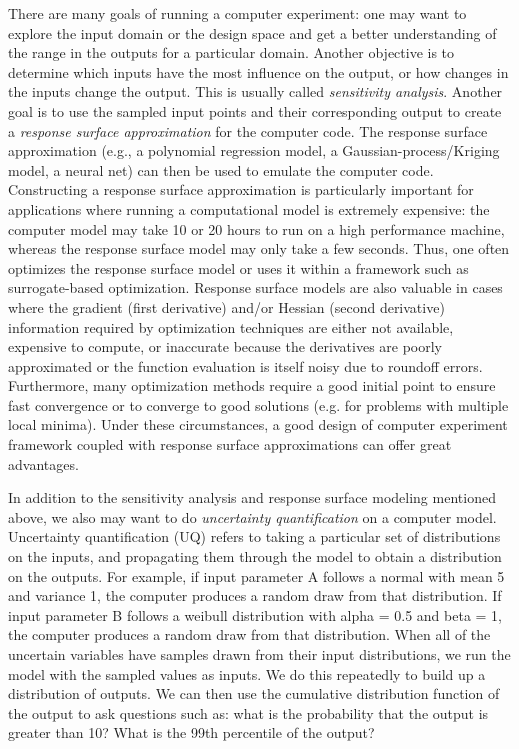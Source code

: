 There are many goals of running a computer experiment: one may want to 
explore the input domain or the design space and get a better understanding 
of the range in the outputs for a particular domain.  Another objective is 
to determine which inputs have the most influence on the output, or how 
changes in the inputs change the output.  This is usually called 
\emph{sensitivity analysis}. 
Another goal is to use the 
sampled input points and their corresponding output to create a 
\emph{response surface approximation} for the computer code.  The response 
surface approximation (e.g., a polynomial regression model, a 
Gaussian-process/Kriging model, a neural net) can then be used to emulate 
the computer code.   
Constructing a response surface approximation is particularly important 
for applications where running a computational model is extremely expensive:  
the computer model may take 10 or 20 hours to run on a high performance 
machine, whereas the response surface model may only take a few seconds.  
Thus, one often optimizes the response surface model or uses it within a 
framework such as surrogate-based optimization.   Response surface models 
are also valuable in cases where the gradient (first derivative) and/or 
Hessian (second derivative) information required by optimization techniques 
are either not available, expensive to compute, or inaccurate because the 
derivatives are poorly approximated or the function evaluation is itself 
noisy due to roundoff errors.  Furthermore, many optimization methods 
require a good initial point to ensure fast convergence or to converge to 
good solutions (e.g. for problems with multiple local minima).  Under these 
circumstances, a good design of computer experiment framework coupled with 
response surface approximations can offer great advantages. 

In addition to the sensitivity analysis and response 
surface modeling mentioned above, we also may want to do 
\emph{uncertainty quantification} on a computer model.  
Uncertainty quantification (UQ) refers to taking a particular set of 
distributions on the inputs, and propagating them through the model to 
obtain a distribution on the outputs.  For example, if input parameter A 
follows a normal with mean 5 and variance 1, the computer produces a random 
draw from that distribution.  If input parameter B follows a weibull 
distribution with alpha = 0.5 and beta = 1, the computer produces a random 
draw from that distribution.  When all of the uncertain variables have 
samples drawn from their input distributions, we run the model with the 
sampled values as inputs.  We do this repeatedly to build up a distribution 
of outputs.  We can then use the cumulative distribution function of the 
output to ask questions such as:  what is the probability that the output is 
greater than 10?   What is the 99th percentile of the output?  


